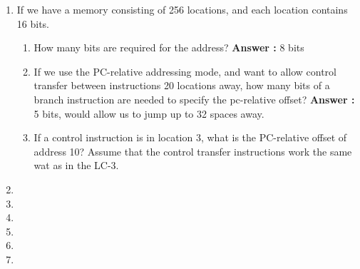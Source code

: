 \documentclass[a4paper,11pt]{article}
\newcommand{\answer}{\textbf{Answer : }}
\begin{document}
\begin{enumerate}
\item If we have a memory consisting of 256 locations, and each location contains 16 bits.
  \begin{enumerate}
  \item How many bits are required for the address? \answer 8 bits
  \item If we use the PC-relative addressing mode, and want to allow control transfer between instructions 20 locations away, how many bits of a branch instruction are needed to specify the pc-relative offset? \answer 5 bits, would allow us to jump up to 32 spaces away.
  \item If a control instruction is in location 3, what is the PC-relative offset of address 10? Assume that the control transfer instructions work the same wat as in the LC-3.
  \end{enumerate}

\item

\item

\item

\item

\item


\item
\end{enumerate}
\end{document}
